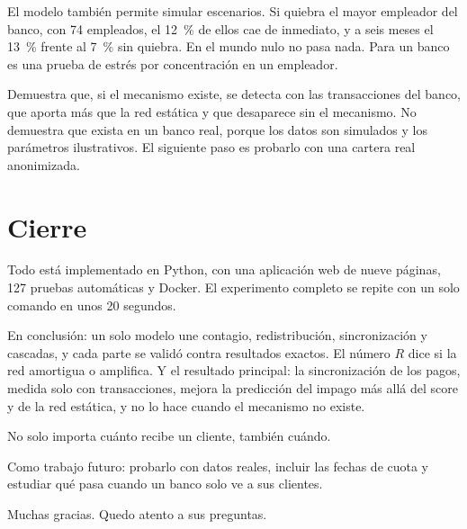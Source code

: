 \begin{decir}
El modelo también permite simular escenarios. Si quiebra el mayor empleador del banco,
con 74 empleados, el 12~\% de ellos cae de inmediato, y a seis meses el 13~\% frente al
7~\% sin quiebra. En el mundo nulo no pasa nada. Para un banco es una prueba de estrés por
concentración en un empleador.
\end{decir}

\begin{decir}
Demuestra que, si el mecanismo existe, se detecta con las transacciones del banco, que
aporta más que la red estática y que desaparece sin el mecanismo. No demuestra que exista
en un banco real, porque los datos son simulados y los parámetros ilustrativos. El
siguiente paso es probarlo con una cartera real anonimizada.
\end{decir}

\section{Cierre}

\begin{decir}
Todo está implementado en Python, con una aplicación web de nueve páginas, 127 pruebas
automáticas y Docker. El experimento completo se repite con un solo comando en unos 20
segundos.
\end{decir}

\begin{decir}
En conclusión: un solo modelo une contagio, redistribución, sincronización y cascadas, y
cada parte se validó contra resultados exactos. El número $R$ dice si la red amortigua o
amplifica. Y el resultado principal: la sincronización de los pagos, medida solo con
transacciones, mejora la predicción del impago más allá del score y de la red estática, y
no lo hace cuando el mecanismo no existe.

No solo importa cuánto recibe un cliente, también cuándo.
\end{decir}

\begin{decir}
Como trabajo futuro: probarlo con datos reales, incluir las fechas de cuota y estudiar qué
pasa cuando un banco solo ve a sus clientes.
\end{decir}

\begin{decir}
Muchas gracias. Quedo atento a sus preguntas.
\end{decir}
